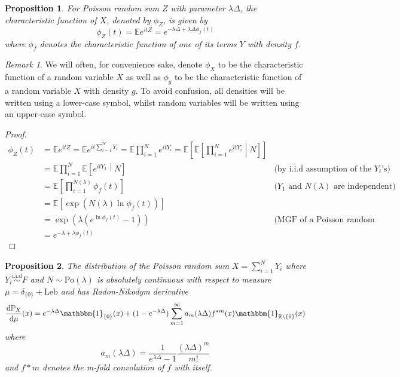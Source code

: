 \documentclass[a4paper,11pt]{article}
\theoremstyle{theorem}
\newtheorem{prop}{Proposition}[section]
\theoremstyle{definition}
\theoremstyle{remark}
\newtheorem*{rem}{Remark}
\providecommand{\E}{\mathbb{E}}
\begin{document}
\begin{prop} \label{characteristicPS}
For Poisson random sum $Z$ with parameter $\lambda \Delta$, the characteristic function of $X$, denoted by $\phi_{Z}$, is given by 
\[
\phi_Z(t) = \mathbb{E}e^{itZ} = e^{-\lambda\Delta + \lambda\Delta\phi_{f}(t)}
\]
where $\phi_{f}$ denotes the characteristic function of one of its terms $Y$ with density $f$. 
\end{prop}

\begin{rem}
We will often, for convenience sake, denote $\phi_{X}$ to be the characteristic function of a random variable $X$ as well as $\phi_{g}$ to be the characteristic function of a random variable $X$ with density $g$. To avoid confusion, all densities will be written using a lower-case symbol, whilst random variables will be written using an upper-case symbol. 
\end{rem}

\begin{proof}
\begin{align*}
\phi_{Z}(t) &= \E e^{itZ} = \E e^{it\sum_{i=1}^{N}{Y_{i}}} 
= \E \prod_{i=1}^{N}{e^{itY_{i}}} 
= \E \left[ \E \left[ \prod_{i=1}^{N}{e^{itY_{i}}} \middle| N \right] \right] \\
          &= \E \prod_{i=1}^{N}{\E \left[ e^{itY_{1}} \middle| N \right]} & \text{(by i.i.d assumption of the } Y_{i}\text{'s)}  \\
          &= \E \left[ \prod_{i=1}^{N(\lambda)}{\phi_{f}(t)} \right] & \text{(}Y_{1} \text{ and } N(\lambda) \text{ are independent)} \\
          &= \E \left[ \exp(N(\lambda) \ln\phi_{f}(t)) \right] \\
          &= \exp(\lambda(e^{\ln\phi_{f}(t)} - 1)) & \text{(MGF of a Poisson random variable)} \\
          &= e^{-\lambda + \lambda \phi_{f}(t)}
\end{align*}
\end{proof}

\begin{prop}
The distribution of the Poisson random sum $X = \sum_{i=1}^{N}{Y_i}$ where $Y_i \overset{\text{i.i.d}}{\sim} F$ and $N \sim \text{Po}(\lambda)$ is absolutely continuous with respect to measure $\mu = \delta_{\{0\}} + \mathrm{Leb}$ and has Radon-Nikodym derivative
\begin{equation} \label{R-N duval}
\frac{\mathrm{d}\mathbb{P}_{X}}{\mathrm{d}\mu}(x) = e^{-\lambda \Delta} \mathbbm{1}_{\{0\}}(x) + (1 - e^{-\lambda \Delta})\sum_{m=1}^{\infty}{a_m(\lambda \Delta) f^{\ast m}(x)\mathbbm{1}_{\mathbb{R}\setminus \{0\}}(x)}
\end{equation}
where
\begin{equation}
a_m(\lambda \Delta) = \frac{1}{e^{\lambda \Delta} - 1}\frac{(\lambda \Delta)^m}{m!}
\end{equation}
and $f*m$ denotes the m-fold convolution of $f$ with itself.
\end{prop}
\end{document}

